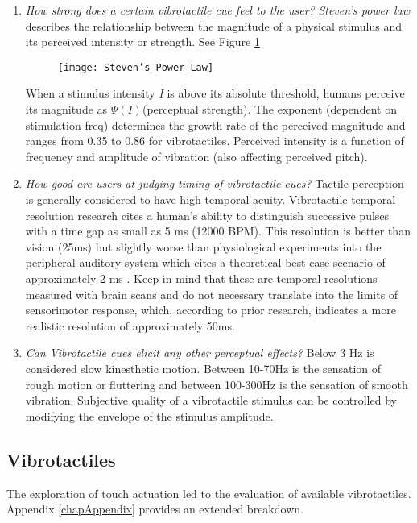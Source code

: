 \begin{enumerate}
    \item \emph{How strong does a certain vibrotactile cue feel to the user?}
\textit{Steven's power law} describes the relationship between the magnitude of a physical stimulus and its perceived intensity or strength. See Figure \ref{fig:StevensPowerLaw}
\begin{figure}[H]
    \texttt{[image: Steven's\_Power\_Law]}
    \label{fig:StevensPowerLaw}
\end{figure}
When a stimulus intensity \textit{I} is above its absolute threshold, humans perceive its magnitude as \begin{math}\Psi(I)\end{math}(perceptual strength). The exponent (dependent on stimulation freq) determines the growth rate of the perceived magnitude and ranges from 0.35 to 0.86 for vibrotactiles. Perceived intensity is a function of frequency and amplitude of vibration (also affecting perceived pitch).
    \item \emph{How good are users at judging timing of vibrotactile cues?}
Tactile perception is generally considered to have high temporal acuity.
Vibrotactile temporal resolution research cites a human's ability to distinguish successive pulses with a time gap as small as 5 ms (12000 BPM). This resolution is better than vision (25ms) but slightly worse than physiological experiments into the peripheral auditory system which cites a theoretical best case scenario of approximately 2 ms \cite{fishbach2001auditory} \cite{parsons2006neurobiology}. Keep in mind that these are temporal resolutions measured with brain scans and do not necessary translate into the limits of sensorimotor response, which, according to prior research, indicates a more realistic resolution of approximately 50ms.
    \item \emph{Can Vibrotactile cues elicit any other perceptual effects?} Below 3 Hz is considered slow kinesthetic motion. Between 10-70Hz is the sensation of rough motion or fluttering and between 100-300Hz is the sensation of smooth vibration. Subjective quality of a vibrotactile stimulus can be controlled by modifying the envelope of the stimulus amplitude.
\end{enumerate}

\subsection{Vibrotactiles}
The exploration of touch actuation led to the evaluation of available vibrotactiles. Appendix \ref{chapAppendix} provides an extended breakdown.

